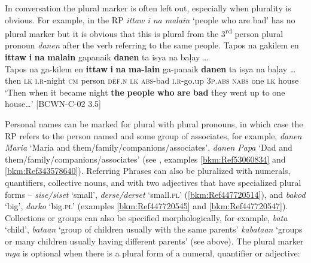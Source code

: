 In conversation the plural marker is often left out, especially when plurality is obvious. For example, in  the RP \textit{ittaw i na malain} ‘people who are bad’ has no plural marker but it is obvious that this is plural from the 3\textsuperscript{rd} person plural pronoun \textit{danen} after the verb referring to the same people.
\ea
\label{bkm:Ref447720182}
Tapos  na  gakilem  en  \textbf{ittaw}  \textbf{i}  \textbf{na}  \textbf{malain} gapanaik  \textbf{danen}  ta  isya  na  baļay … \\\smallskip
 \gll Tapos  na  ga-kilem  en  \textbf{ittaw}  \textbf{i}  \textbf{na}  \textbf{ma-lain} ga-panaik  \textbf{danen}  ta  isya  na  baļay … \\
then  \textsc{lk}  \textsc{i.r}-night  \textsc{cm}  person  \textsc{def.n}  \textsc{lk}  \textsc{abs}-bad\footnotemark{}
\textsc{i.r}-go.up  3\textsc{p.abs}  \textsc{nabs}  one  \textsc{lk}  house \\
\glt `Then when it became night \textbf{the} \textbf{people} \textbf{who} \textbf{are} \textbf{bad} they went up to one house…' [BCWN-C-02  3.5]
\z 

Personal names can be marked for plural with plural pronouns, in which case the RP refers to the person named and some group of associates, for example, \textit{danen Maria} `Maria and them/family/companions/associates', \textit{danen Papa} `Dad and them/family/companions/associates' (see , examples \ref{bkm:Ref53060834} and \ref{bkm:Ref343578640}). Referring Phrases can also be pluralized with numerals, quantifiers, collective nouns, and with two adjectives that have specialized plural forms – \textit{sise/siset} ‘small’, \textit{derse/derset} ‘small.\textsc{pl}’ (\ref{bkm:Ref447720514}), and \textit{bakod} ‘big’,  \textit{darko} ‘big.\textsc{pl}’ (examples \ref{bkm:Ref447720545} and \ref{bkm:Ref447720547}). Collections or groups can also be specified morphologically, for example, \textit{bata} ‘child’, \textit{bataan} ‘group of children usually with the same parents’ \textit{kabataan} ‘groups or many children usually having different parents’ (see  above). The plural marker \textit{mga} is optional when there is a plural form of a numeral, quantifier or adjective:

